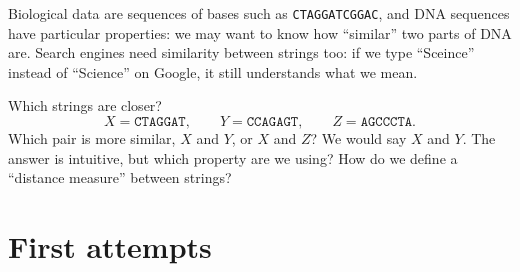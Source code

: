\documentclass[a4paper,12pt,oneside]{report}
\begin{document}
Biological data are sequences of bases such as
\texttt{CTAGGATCGGAC}, and DNA sequences have particular properties: we
may want to know how ``similar'' two parts of DNA are. Search engines
need similarity between strings too: if we type ``Sceince'' instead
of ``Science'' on Google, it still understands what we mean.

\begin{framedexample}{Which strings are closer?}\label{ex:three-strings}
\[
  X=\texttt{CTAGGAT},\qquad
  Y=\texttt{CCAGAGT},\qquad
  Z=\texttt{AGCCCTA}.
\]
Which pair is more similar, $X$ and $Y$, or $X$ and $Z$? We would say
$X$ and $Y$. The answer is intuitive, but which property are we using?
How do we define a ``distance measure'' between strings?
\end{framedexample}

\section{First attempts}
\end{document}
